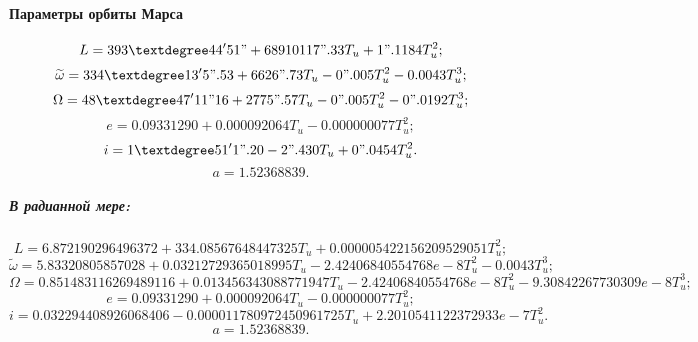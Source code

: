 \paragraph{Параметры орбиты Марса}
$$L = 393°44'51" + 68910117".33 T_u + 1".1184 T_u^2;$$
$$\widetilde{\omega} = 334°13'5".53 + 6626".73 T_u - 0".005  T_u^2 - 0.0043  T_u^3;$$
$$\Omega = 48°47'11"16 + 2775".57 T_u - 0".005 T_u^2 - 0".0192 T_u^3;$$
$$e = 0.09331290 + 0.000092064 T_u - 0.000000077 T_u^2;$$
$$i = 1°51'1".20 - 2".430 T_u + 0".0454 T_u^2.$$
$$a = 1.52368839.$$

\subparagraph{В радианной мере:}
$$L = 6.872190296496372 + 334.08567648447325 T_u + 0.000005422156209529051 T_u^2;$$
$$\widetilde{\omega} = 5.83320805857028 + 0.03212729365018995 T_u - 2.42406840554768e-8  T_u^2 - 0.0043  T_u^3;$$
$$\Omega = 0.851483116269489116 + 0.013456343088771947 T_u - 2.42406840554768e-8 T_u^2 - 9.30842267730309e-8 T_u^3;$$
$$e = 0.09331290 + 0.000092064 T_u - 0.000000077 T_u^2;$$
$$i = 0.032294408926068406 - 0.000011780972450961725 T_u + 2.2010541122372933e-7 T_u^2.$$
$$a = 1.52368839.$$
